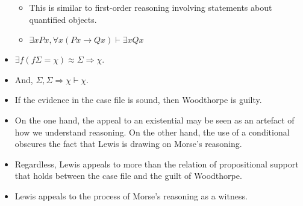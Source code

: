 \documentclass[10pt]{article}
\begin{document}
\begin{itemize}
\begin{itemize}
\begin{itemize}
    \end{itemize}
  \item This is similar to first-order reasoning involving statements about quantified objects.
  \item \(\exists xPx, \forall x(Px \rightarrow Qx) \vdash \exists x Qx\)
  \end{itemize}
\item \(\exists f(f\Sigma = \chi) \approx \Sigma \Rightarrow \chi\).
\item And, \(\Sigma, \Sigma \Rightarrow \chi \vdash \chi\).
\item If the evidence in the case file is sound, then Woodthorpe is guilty.
\item On the one hand, the appeal to an existential may be seen as an artefact of how we understand reasoning.
  On the other hand, the use of a conditional obscures the fact that Lewis is drawing on Morse's reasoning.
\item Regardless, Lewis appeals to more than the relation of propositional support that holds between the case file and the guilt of Woodthorpe.
\item Lewis appeals to the process of Morse's reasoning as a witness.
\end{itemize}
\end{document}
